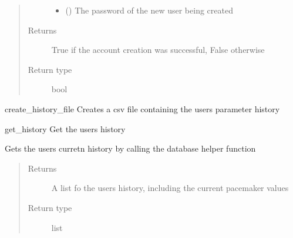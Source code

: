 \documentclass[letterpaper,10pt,english]{sphinxmanual}
\begin{document}
\begin{fulllineitems}
\begin{fulllineitems}
\begin{quote}
\begin{description}
\begin{itemize}
\item {} 
 () \textendash{} The password of the new user being created

\end{itemize}

\item[{Returns}] \leavevmode
True if the account creation was successful, False otherwise

\item[{Return type}] \leavevmode
bool

\end{description}\end{quote}

\end{fulllineitems}


\begin{fulllineitems}
\label{\detokenize{index:data.user.User.create_history_file}}
create\_history\_file Creates a csv file containing the users parameter history

\end{fulllineitems}


\begin{fulllineitems}
\label{\detokenize{index:data.user.User.get_history}}
get\_history Get the users history

Gets the users curretn history by calling the database
helper function
\begin{quote}\begin{description}
\item[{Returns}] \leavevmode
A list fo the users history, including the current pacemaker values

\item[{Return type}] \leavevmode
list

\end{description}\end{quote}

\end{fulllineitems}


\end{fulllineitems}
\end{document}
